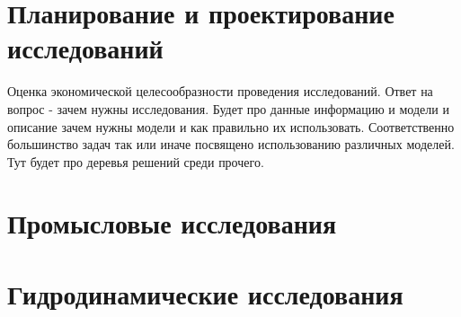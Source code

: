 \documentclass{memoir}
\begin{document}
\chapter{Планирование и проектирование исследований}

Оценка экономической целесообразности проведения исследований. Ответ на вопрос - зачем нужны исследования. 
Будет про данные информацию и модели и описание зачем нужны модели и как правильно их использовать.
Соответственно большинство задач так или иначе посвящено использованию различных моделей. 
Тут будет про деревья решений среди прочего.





\chapter{Промысловые исследования}









\chapter{Гидродинамические исследования}





\printbibliography
\end{document}
